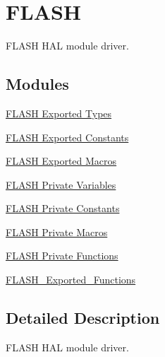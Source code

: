 \hypertarget{group___f_l_a_s_h}{}\section{F\+L\+A\+SH}
\label{group___f_l_a_s_h}


F\+L\+A\+SH H\+AL module driver.  


\subsection*{Modules}
\begin{DoxyCompactItemize}
\item 
\hyperlink{group___f_l_a_s_h___exported___types}{F\+L\+A\+S\+H Exported Types}
\item 
\hyperlink{group___f_l_a_s_h___exported___constants}{F\+L\+A\+S\+H Exported Constants}
\item 
\hyperlink{group___f_l_a_s_h___exported___macros}{F\+L\+A\+S\+H Exported Macros}
\item 
\hyperlink{group___f_l_a_s_h___private___variables}{F\+L\+A\+S\+H Private Variables}
\item 
\hyperlink{group___f_l_a_s_h___private___constants}{F\+L\+A\+S\+H Private Constants}
\item 
\hyperlink{group___f_l_a_s_h___private___macros}{F\+L\+A\+S\+H Private Macros}
\item 
\hyperlink{group___f_l_a_s_h___private___functions}{F\+L\+A\+S\+H Private Functions}
\item 
\hyperlink{group___f_l_a_s_h___exported___functions}{F\+L\+A\+S\+H\+\_\+\+Exported\+\_\+\+Functions}
\end{DoxyCompactItemize}


\subsection{Detailed Description}
F\+L\+A\+SH H\+AL module driver. 

